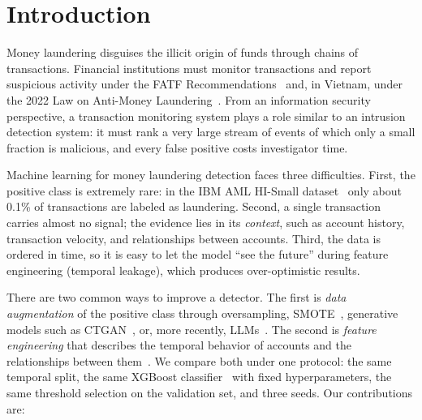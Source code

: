 \documentclass[sigconf,nonacm]{acmart}
\begin{document}

\maketitle
\pagestyle{plain}  %

\section{Introduction}

Money laundering disguises the illicit origin of funds through chains of transactions. Financial institutions must
monitor transactions and report suspicious activity under the FATF Recommendations~\cite{fatf2012} and, in Vietnam,
under the 2022 Law on Anti-Money Laundering~\cite{luatpcrt2022en}. From an information security perspective, a
transaction monitoring system plays a role similar to an intrusion detection system: it must rank a very large
stream of events of which only a small fraction is malicious, and every false positive costs investigator time.

Machine learning for money laundering detection faces three difficulties. First, the positive class is extremely
rare: in the IBM AML HI-Small dataset~\cite{altman2023realistic} only about 0.1\% of transactions are labeled as
laundering. Second, a single transaction carries almost no signal; the evidence lies in its \emph{context}, such as
account history, transaction velocity, and relationships between accounts. Third, the data is ordered in time, so it
is easy to let the model ``see the future'' during feature engineering (temporal leakage), which produces
over-optimistic results.

There are two common ways to improve a detector. The first is \emph{data augmentation} of the positive class through
oversampling, SMOTE~\cite{chawla2002smote}, generative models such as CTGAN~\cite{xu2019ctgan}, or, more recently,
LLMs~\cite{borisov2023great,seedat2024cllm}. The second is \emph{feature engineering} that describes the temporal
behavior of accounts and the relationships between them~\cite{blanusa2024gfp,deprez2024network}. We compare both
under one protocol: the same temporal split, the same XGBoost classifier~\cite{chen2016xgboost} with fixed
hyperparameters, the same threshold selection on the validation set, and three seeds. Our contributions are:
\end{document}
